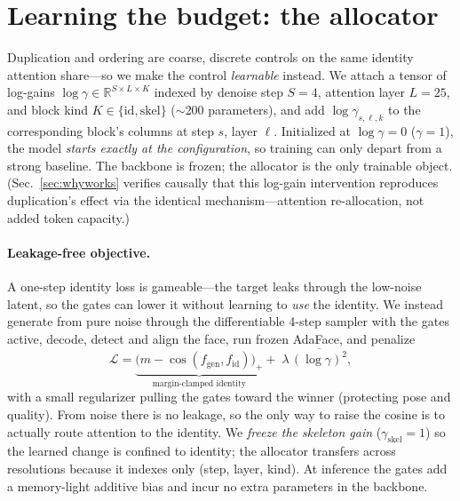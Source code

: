 \section{Learning the budget: the \gate{} allocator}
\label{sec:learned}
Duplication and ordering are coarse, discrete controls on the same identity
attention share---so we make the control \emph{learnable} instead. We attach a
tensor of log-gains
$\log\gamma\in\mathbb{R}^{S\times L\times K}$ indexed by denoise step $S{=}4$,
attention layer $L{=}25$, and block kind $K{\in}\{\mathrm{id},\mathrm{skel}\}$
($\sim$200 parameters), and add $\log\gamma_{s,\ell,k}$ to the corresponding
block's columns at step $s$, layer $\ell$. Initialized at $\log\gamma{=}0$
($\gamma{=}1$), the model \emph{starts exactly at the \dupid{} configuration}, so
training can only depart from a strong baseline. The backbone is frozen; the
allocator is the only trainable object. (Sec.~\ref{sec:whyworks} verifies
causally that this log-gain intervention reproduces duplication's effect via
the identical mechanism---attention re-allocation, not added token capacity.)

\paragraph{Leakage-free objective.} A one-step identity loss is gameable---the
target leaks through the low-noise latent, so the gates can lower it without
learning to \emph{use} the identity. We instead generate from pure noise through
the differentiable 4-step sampler with the gates active, decode, detect and align
the face, run frozen AdaFace, and penalize
\begin{equation}
\mathcal{L}=\underbrace{\big(m-\cos(f_{\mathrm{gen}},f_{\mathrm{id}})\big)_{+}}_{\text{margin-clamped identity}}+\;\lambda\,\overline{(\log\gamma)^2},
\label{eq:gateloss}
\end{equation}
with a small regularizer pulling the gates toward the winner (protecting pose and
quality). From noise there is no leakage, so the only way to raise the cosine is
to actually route attention to the identity. We \emph{freeze the skeleton gain}
($\gamma_{\mathrm{skel}}{=}1$) so the learned change is confined to identity; the
allocator transfers across resolutions because it indexes only (step, layer,
kind). At inference the gates add a memory-light additive bias and incur no
extra parameters in the backbone.

